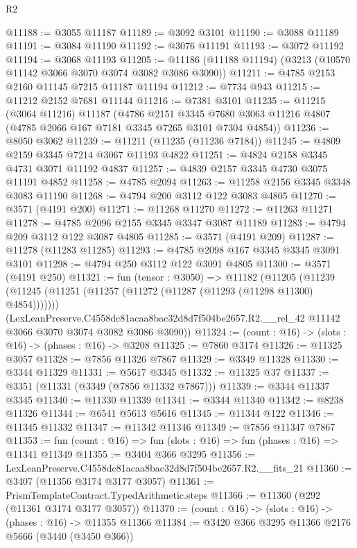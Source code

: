 \begin{lexlean}{R2}
\begin{coremodule}
@11188 := @3055 @11187
@11189 := @3092 @3101
@11190 := @3088 @11189
@11191 := @3084 @11190
@11192 := @3076 @11191
@11193 := @3072 @11192
@11194 := @3068 @11193
@11205 := @11186 (@11188 @11194) (@3213 (@10570 @11142 @3066 @3070 @3074 @3082 @3086 @3090))
@11211 := @4785 @2153 @2160 @11145 @7215 @11187 @11194
@11212 := @7734 @943
@11215 := @11212 @2152 @7681 @11144
@11216 := @7381 @3101
@11235 := @11215
    (@3064 @11216)
    @11187
    (@4786
      @2151
      @3345
      @7680
      @3063
      @11216
      @4807
      (@4785 @2066 @167 @7181 @3345 @7265 @3101 @7304 @4854))
@11236 := @8050 @3062
@11239 := @11211 (@11235 (@11236 @7184))
@11245 := @4809 @2159 @3345 @7214 @3067 @11193 @4822
@11251 := @4824 @2158 @3345 @4731 @3071 @11192 @4837
@11257 := @4839 @2157 @3345 @4730 @3075 @11191 @4852
@11258 := @4785 @2094
@11263 := @11258 @2156 @3345 @3348 @3083 @11190
@11268 := @4794 @200 @3112 @122 @3083 @4805
@11270 := @3571 (@4191 @200)
@11271 := @11268 @11270
@11272 := @11263 @11271
@11278 := @4785 @2096 @2155 @3345 @3347 @3087 @11189
@11283 := @4794 @209 @3112 @122 @3087 @4805
@11285 := @3571 (@4191 @209)
@11287 := @11278 (@11283 @11285)
@11293 := @4785 @2098 @167 @3345 @3345 @3091 @3101
@11298 := @4794 @250 @3112 @122 @3091 @4805
@11300 := @3571 (@4191 @250)
@11321 := fun (tensor : @3050) =>
  @11182
    (@11205
      (@11239 (@11245 (@11251 (@11257 (@11272 (@11287 (@11293 (@11298 @11300) @4854)))))))
      (LexLeanPreserve.C4558dc81acaa8bac32d8d7f504be2657.R2.__rel_42
        @11142
        @3066
        @3070
        @3074
        @3082
        @3086
        @3090))
@11324 := (count : @16) -> (slots : @16) -> (phases : @16) -> @3208
@11325 := @7860 @3174
@11326 := @11325 @3057
@11328 := @7856 @11326 @7867
@11329 := @3349 @11328
@11330 := @3344 @11329
@11331 := @5617 @3345
@11332 := @11325 @37
@11337 := @3351 (@11331 (@3349 (@7856 @11332 @7867)))
@11339 := @3344 @11337 @3345
@11340 := @11330 @11339
@11341 := @3344 @11340
@11342 := @8238 @11326
@11344 := @6541 @5613 @5616
@11345 := @11344 @122
@11346 := @11345 @11332
@11347 := @11342 @11346
@11349 := @7856 @11347 @7867
@11353 := fun (count : @16) => fun (slots : @16) => fun (phases : @16) => @11341 @11349
@11355 := @3404 @366 @3295
@11356 := LexLeanPreserve.C4558dc81acaa8bac32d8d7f504be2657.R2.__fits_21
@11360 := @3407 (@11356 @3174 @3177 @3057)
@11361 := PrismTemplateContract.TypedArithmetic.steps
@11366 := @11360 (@292 (@11361 @3174 @3177 @3057))
@11370 := (count : @16) -> (slots : @16) -> (phases : @16) -> @11355 @11366
@11384 := @3420
    @366
    @3295
    @11366
    @2176
    @5666
    (@3440 (@3450 @366))

\end{coremodule}
\end{lexlean}
